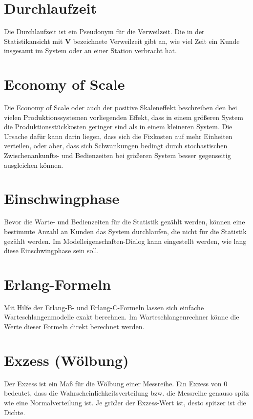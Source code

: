 \section*{Durchlaufzeit}


Die Durchlaufzeit ist ein Pseudonym für die Verweilzeit.
Die in der Statistikansicht mit \textbf{V} bezeichnete Verweilzeit
gibt an, wie viel Zeit ein Kunde insgesamt im System oder an einer Station verbracht hat.

\section*{Economy of Scale}


Die Economy of Scale oder auch der positive Skaleneffekt beschreiben den bei vielen Produktionssystemen
vorliegenden Effekt, dass in einem größeren System die Produktionsstückkosten geringer sind als in
einem kleineren System. Die Ursache dafür kann darin liegen, dass sich die Fixkosten auf mehr Einheiten
verteilen, oder aber, dass sich Schwankungen bedingt durch stochastischen Zwischenankunfts- und Bedienzeiten
bei größeren System besser gegenseitig ausgleichen können.

\section*{Einschwingphase}


Bevor die Warte- und Bedienzeiten für die Statistik gezählt werden, können eine bestimmte Anzahl an Kunden
das System durchlaufen, die nicht für die Statistik gezählt werden. Im
Modelleigenschaften-Dialog kann eingestellt werden, wie lang diese
Einschwingphase sein soll.

\section*{Erlang-Formeln}


Mit Hilfe der Erlang-B- und Erlang-C-Formeln lassen sich einfache Warteschlangenmodelle exakt berechnen.
Im Warteschlangenrechner könne die Werte dieser Formeln direkt
berechnet werden.

\section*{Exzess (Wölbung)}


Der Exzess ist ein Maß für die Wölbung einer Messreihe.
Ein Exzess von 0 bedeutet, dass die Wahrscheinlichkeitsverteilung bzw. die Messreihe genauso spitz wie eine Normalverteilung ist.
Je größer der Exzess-Wert ist, desto spitzer ist die Dichte.

